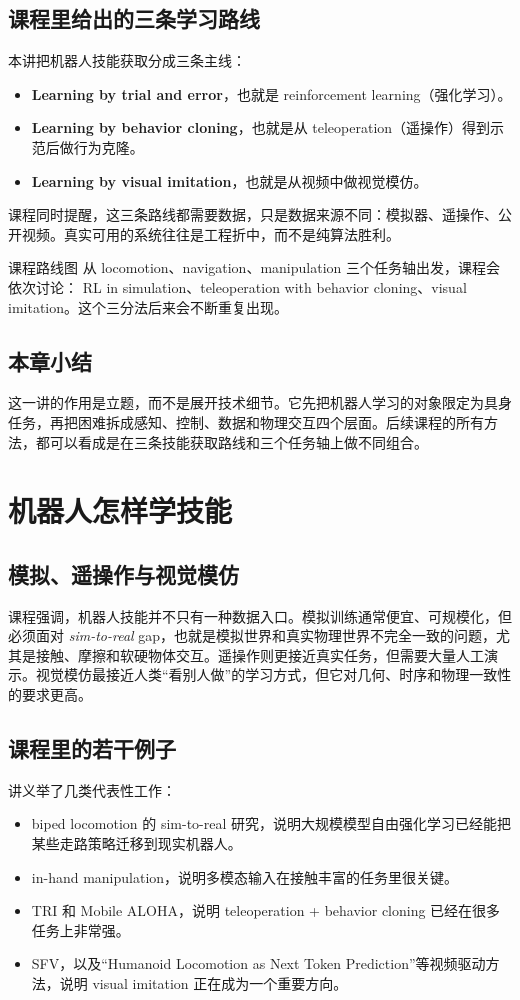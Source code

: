 \documentclass[a4paper]{article}
\begin{document}
\subsection{课程里给出的三条学习路线}
本讲把机器人技能获取分成三条主线：
\begin{itemize}
    \item \textbf{Learning by trial and error}，也就是 reinforcement learning（强化学习）。
    \item \textbf{Learning by behavior cloning}，也就是从 teleoperation（遥操作）得到示范后做行为克隆。
    \item \textbf{Learning by visual imitation}，也就是从视频中做视觉模仿。
\end{itemize}
课程同时提醒，这三条路线都需要数据，只是数据来源不同：模拟器、遥操作、公开视频。真实可用的系统往往是工程折中，而不是纯算法胜利。

\begin{knowledgebox}{课程路线图}
从 locomotion、navigation、manipulation 三个任务轴出发，课程会依次讨论：
RL in simulation、teleoperation with behavior cloning、visual imitation。这个三分法后来会不断重复出现。
\end{knowledgebox}

\subsection{本章小结}
这一讲的作用是立题，而不是展开技术细节。它先把机器人学习的对象限定为具身任务，再把困难拆成感知、控制、数据和物理交互四个层面。后续课程的所有方法，都可以看成是在三条技能获取路线和三个任务轴上做不同组合。

\section{机器人怎样学技能}
\subsection{模拟、遥操作与视觉模仿}
课程强调，机器人技能并不只有一种数据入口。模拟训练通常便宜、可规模化，但必须面对 \emph{sim-to-real} gap，也就是模拟世界和真实物理世界不完全一致的问题，尤其是接触、摩擦和软硬物体交互。遥操作则更接近真实任务，但需要大量人工演示。视觉模仿最接近人类“看别人做”的学习方式，但它对几何、时序和物理一致性的要求更高。

\subsection{课程里的若干例子}
讲义举了几类代表性工作：
\begin{itemize}
    \item biped locomotion 的 sim-to-real 研究，说明大规模模型自由强化学习已经能把某些走路策略迁移到现实机器人。
    \item in-hand manipulation，说明多模态输入在接触丰富的任务里很关键。
    \item TRI 和 Mobile ALOHA，说明 teleoperation + behavior cloning 已经在很多任务上非常强。
    \item SFV，以及“Humanoid Locomotion as Next Token Prediction”等视频驱动方法，说明 visual imitation 正在成为一个重要方向。
\end{itemize}
\end{document}
